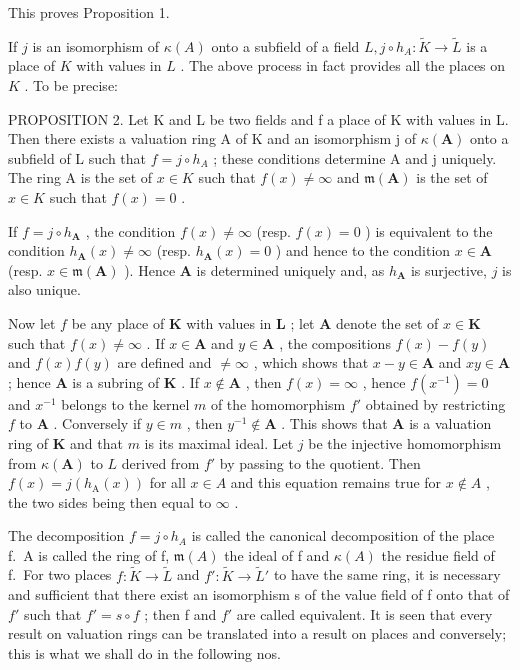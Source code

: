 This proves Proposition 1.

If \(j\) is an isomorphism of \(\kappa(A)\) onto a subfield of a field \(L, j \circ h_{A}: \tilde{K} \to \tilde{L}\) is a place of \(K\) with values in \(L\) . The above process in fact provides all the places on \(K\) . To be precise:

PROPOSITION 2. Let K and L be two fields and f a place of K with values in L. Then there exists a valuation ring A of K and an isomorphism j of \(\kappa(\mathbf{A})\) onto a subfield of L such that \(f = j \circ h_{A}\) ; these conditions determine A and j uniquely. The ring A is the set of \(x \in K\) such that \(f(x) \neq \infty\) and \(\mathfrak{m}(\mathbf{A})\) is the set of \(x \in K\) such that \(f(x) = 0\) .

If \(f = j \circ h_{\mathbf{A}}\) , the condition \(f(x) \neq \infty\) (resp. \(f(x) = 0\) ) is equivalent to the condition \(h_{\mathbf{A}}(x) \neq \infty\) (resp. \(h_{\mathbf{A}}(x) = 0\) ) and hence to the condition \(x \in \mathbf{A}\) (resp. \(x \in \mathfrak{m}(\mathbf{A})\) ). Hence \(\mathbf{A}\) is determined uniquely and, as \(h_{\mathbf{A}}\) is surjective, \(j\) is also unique.

Now let \(f\) be any place of \(\mathbf{K}\) with values in \(\mathbf{L}\) ; let \(\mathbf{A}\) denote the set of \(x \in \mathbf{K}\) such that \(f(x) \neq \infty\) . If \(x \in \mathbf{A}\) and \(y \in \mathbf{A}\) , the compositions \(f(x) - f(y)\) and \(f(x)f(y)\) are defined and \(\neq \infty\) , which shows that \(x - y \in \mathbf{A}\) and \(xy \in \mathbf{A}\) ; hence \(\mathbf{A}\) is a subring of \(\mathbf{K}\) . If \(x \notin \mathbf{A}\) , then \(f(x) = \infty\) , hence \(f(x^{-1}) = 0\) and \(x^{-1}\) belongs to the kernel \(m\) of the homomorphism \(f'\) obtained by restricting \(f\) to \(\mathbf{A}\) . Conversely if \(y \in m\) , then \(y^{-1} \notin \mathbf{A}\) . This shows that \(\mathbf{A}\) is a valuation ring of \(\mathbf{K}\) and that \(m\) is its maximal ideal. Let \(j\) be the injective homomorphism from \(\kappa(\mathbf{A})\) to \(L\) derived from \(f'\) by passing to the quotient. Then \(f(x) = j(h_{\mathrm{A}}(x))\) for all \(x \in A\) and this equation remains true for \(x \notin A\) , the two sides being then equal to \(\infty\) .

The decomposition \(f = j \circ h_{A}\) is called the canonical decomposition of the place f.~A is called the ring of f, \(\mathfrak{m}(A)\) the ideal of f and \(\kappa(A)\) the residue field of f.~For two places \(f: \tilde{K} \to \tilde{L}\) and \(f': \tilde{K} \to \tilde{L}'\) to have the same ring, it is necessary and sufficient that there exist an isomorphism s of the value field of f onto that of \(f'\) such that \(f' = s \circ f\) ; then f and \(f'\) are called equivalent. It is seen that every result on valuation rings can be translated into a result on places and conversely; this is what we shall do in the following nos.


